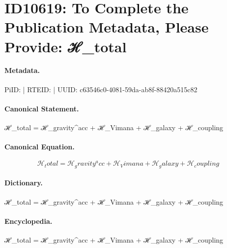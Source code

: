 \section*{ID10619: To Complete the Publication Metadata, Please Provide: ℋ\_total}
\paragraph{Metadata.}
PiID:  | RTEID:  | UUID: c63546c0-4081-59da-ab8f-88420a515c82

\paragraph{Canonical Statement.}
ℋ\_total = ℋ\_gravity\textasciicircum{}acc + ℋ\_Vimana + ℋ\_galaxy + ℋ\_coupling

\paragraph{Canonical Equation.}
\[
ℋ_total = ℋ_gravity^acc + ℋ_Vimana + ℋ_galaxy + ℋ_coupling
\]

\paragraph{Dictionary.}
ℋ\_total = ℋ\_gravity\textasciicircum{}acc + ℋ\_Vimana + ℋ\_galaxy + ℋ\_coupling

\paragraph{Encyclopedia.}
ℋ\_total = ℋ\_gravity\textasciicircum{}acc + ℋ\_Vimana + ℋ\_galaxy + ℋ\_coupling
